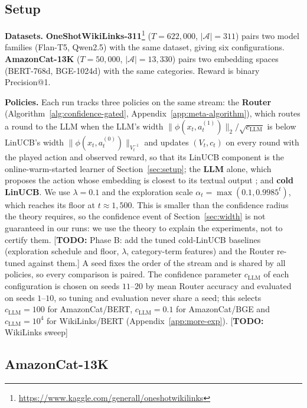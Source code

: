 \documentclass[anon]{alt2027} %
\newcommand{\todo}[1]{\textcolor{red!70!black}{[\textbf{TODO:} #1]}}
\begin{document}
\subsection{Setup}
\label{sec:exp-setup}

\textbf{Datasets.} \textbf{OneShotWikiLinks-311}\footnote{\url{https://www.kaggle.com/generall/oneshotwikilinks}} ($T\!=\!622{,}000$,
$|\mathcal A|\!=\!311$) pairs two model families (Flan-T5, Qwen2.5) with the
same dataset, giving six configurations. \textbf{AmazonCat-13K}
\citep{bhatia2016extreme} ($T\!=\!50{,}000$, $|\mathcal A|\!=\!13{,}330$) pairs two embedding spaces
(BERT-768d, BGE-1024d) with the same categories. Reward is binary
Precision@1.

\textbf{Policies.} Each run tracks three policies on the same stream: the
\textbf{Router} (Algorithm~\ref{alg:confidence-gated},
Appendix~\ref{app:meta-algorithm}), which routes a round to the LLM when the
LLM's width $\|\phi(x_t,a_t^{(1)})\|_2/\sqrt{c_{\mathrm{LLM}}}$ is below LinUCB's width
$\|\phi(x_t,a_t^{(0)})\|_{V_t^{-1}}$ and updates $(V_t,c_t)$ on every round
with the played action and observed reward, so that its LinUCB component is
the online-warm-started learner of Section~\ref{sec:setup}; the \textbf{LLM}
alone, which proposes the action whose embedding is closest to its textual
output \citep{chen2024llmdecision}; and \textbf{cold LinUCB}. We use
$\lambda=0.1$ and the exploration scale $\alpha_t=\max(0.1,0.9985^t)$, which
reaches its floor at $t\approx1{,}500$. This is smaller than the confidence
radius the theory requires, so the confidence event of
Section~\ref{sec:width} is not guaranteed in our runs: we use the theory to
explain the experiments, not to certify them.
\todo{Phase B: add the tuned cold-LinUCB baselines (exploration schedule and
floor, $\lambda$, category-term features) and the Router re-tuned against them.}
A seed fixes the order of the
stream and is shared by all policies, so every comparison is paired. The
confidence parameter $c_{\mathrm{LLM}}$ of each configuration is chosen on seeds $11$--$20$
by mean Router accuracy and evaluated on seeds $1$--$10$, so tuning and
evaluation never share a seed; this selects $c_{\mathrm{LLM}}=100$ for AmazonCat/BERT,
$c_{\mathrm{LLM}}=0.1$ for AmazonCat/BGE and $c_{\mathrm{LLM}}=10^4$ for WikiLinks/BERT
(Appendix~\ref{app:more-exp}).
\todo{WikiLinks sweep}

\subsection{AmazonCat-13K}
\label{sec:amazon}
\end{document}
